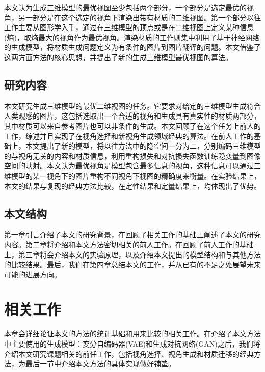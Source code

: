 \documentclass[UTF8,openany,AutoFakeBold,AutoFakeSlant,cs4size]{ctexbook}
\begin{document}
本文认为生成三维模型的最优视图至少包括两个部分，一个部分是选定最优的视角，另一部分是在这个选定的视角下渲染出带有材质的二维视图。第一个部分以往工作主要从图形学入手，通过在三维模型的顶点或是在二维视图上定义某种信息(熵)，取熵最大的视角作为最优视角。渲染材质的工作则集中利用了基于神经网络的生成模型，将材质生成问题定义为有条件的图片到图片翻译的问题。本文借鉴了这两方面方法的核心思想，并提出了新的生成三维模型最优视图的算法。

\section{研究内容}

本文研究生成三维模型的最优二维视图的任务。它要求对给定的三维模型生成符合人类观感的图片，这包括选取出一个合适的视角和生成具有真实性的材质两部分，其中材质可以来自参考图片也可以非条件的生成。本文回顾了在这个任务上前人的工作，综述并且实现了在视角选择和新视角生成领域经典的算法。在前人工作的基础上，本文提出了新的模型，将以往方法中的隐空间一分为二，分别编码三维模型的与视角无关的内容和材质信息，利用重构损失和对抗损失函数训练隐变量到图像空间的映射。本文认为最优视角是模型包含最多信息的视角，这种信息可以通过三维模型的某一视角下的图片重构不同视角下视图的精确度来衡量。在实验结果上，本文的结果与复现的经典方法比较，在定性结果和定量结果上，均体现出了优势。

\section{本文结构}

第一章引言介绍了本文的研究背景，在回顾了相关工作的基础上阐述了本文的研究内容。第二章将介绍和本文方法密切相关的前人工作。在回顾了前人工作的基础上，第三章将会介绍本文的实验原理，以及介绍本文提出的模型结构和与其他方法的比较结果。最后，我们在第四章总结本文的工作，并从已有的不足之处展望未来可能的进展方向。



\clearpage

\chapter{相关工作}

本章会详细论证本文的方法的统计基础和用来比较的相关工作。在介绍了本文方法中主要使用的生成模型：变分自编码器(VAE)\cite{kingma2014autoencoding}和生成对抗网络(GAN)\cite{NIPS2014_5423}之后，我们将介绍本文研究课题相关的前任工作，包括视角选择、视角生成和材质迁移的经典方法，为最后一节中介绍本文方法的具体实现做好铺垫。
\end{document}

